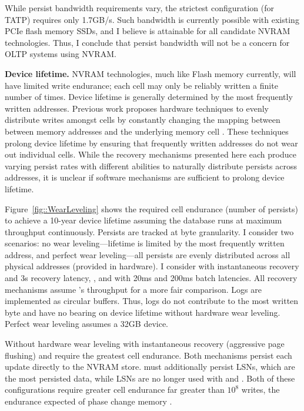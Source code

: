 While persist bandwidth requirements vary, the strictest configuration (\NVDisk for TATP) requires only 1.7GB/s.
Such bandwidth is currently possible with existing PCIe flash memory SSDs, and I believe is attainable for all candidate NVRAM technologies.
Thus, I conclude that persist bandwidth will not be a concern for OLTP systems using NVRAM.

\textbf{Device lifetime.}
NVRAM technologies, much like Flash memory currently, will have limited write endurance; each cell may only be reliably written a finite number of times.
Device lifetime is generally determined by the most frequently written addresses.
Previous work proposes hardware techniques to evenly distribute writes amongst cells by constantly changing the mapping between between memory addresses and the underlying memory cell \cite{QureshiKaridis09}.
These techniques prolong device lifetime by ensuring that frequently written addresses do not wear out individual cells.
While the recovery mechanisms presented here each produce varying persist rates with different abilities to naturally distribute persists across addresses, it is unclear if software mechanisms are sufficient to prolong device lifetime.


Figure~\ref{fig::WearLeveling} shows the required cell endurance (number of persists) to achieve a 10-year device lifetime assuming the database runs at maximum throughput continuously.
Persists are tracked at byte granularity.
I consider two scenarios: no wear leveling---lifetime is limited by the most frequently written address, and perfect wear leveling---all persists are evenly distributed across all physical addresses (provided in hardware).
I consider \NVDisk with instantaneous recovery and 3s recovery latency, \InPlace, and \GroupCommit with 20ms and 200ms batch latencies.
All recovery mechanisms assume \InPlace's throughput for a more fair comparison.
Logs are implemented as circular buffers.
Thus, logs do not contribute to the most written byte and have no bearing on device lifetime without hardware wear leveling.
Perfect wear leveling assumes a 32GB device.

Without hardware wear leveling \NVDisk with instantaneous recovery (aggressive page flushing) and \InPlace require the greatest cell endurance.
Both mechanisms persist each update directly to the NVRAM store.
\NVDisk must additionally persist LSNs, which are the most persisted data, while LSNs are no longer used with \InPlace and \GroupCommit.
Both of these configurations require greater cell endurance far greater than $10^8$ writes, the endurance expected of phase change memory \cite{BurrKurdi08}.

